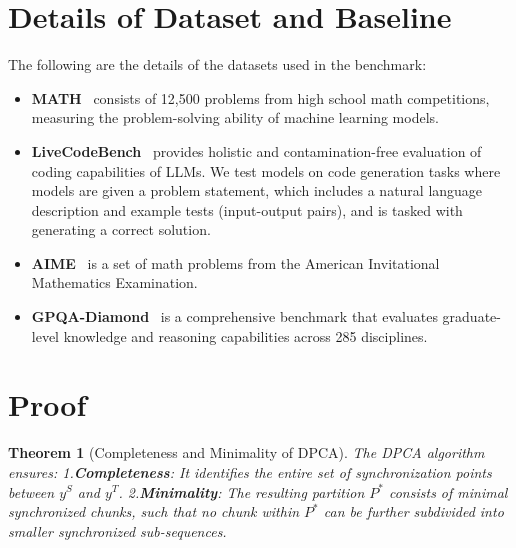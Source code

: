 \documentclass{article}
\theoremstyle{plain}
\newtheorem{theorem}{Theorem}[section]
\theoremstyle{definition}
\theoremstyle{remark}
\begin{document}
\section{Details of Dataset and Baseline}\label{app:data}
The following are the details of the datasets used in the benchmark:
\begin{itemize}
     \item \textbf{MATH}~\cite{hendrycksmath2021} consists of 12,500 problems from high school math competitions, measuring the problem-solving ability of machine learning models.
    \item \textbf{LiveCodeBench}~\cite{jain2024livecodebench} provides holistic and contamination-free evaluation of coding capabilities of LLMs. We test models on code generation tasks where models are given a problem statement, which includes a natural language description and example tests (input-output pairs), and is tasked with generating a correct solution.
    \item \textbf{AIME}~\cite{aime26} is a set of math problems from the American Invitational Mathematics Examination.
    \item \textbf{GPQA-Diamond}~\cite{rein2023gpqagraduatelevelgoogleproofqa} is a comprehensive benchmark that evaluates graduate-level knowledge and reasoning capabilities across 285 disciplines.
   
    
\end{itemize}


 
\section{Proof}\label{app:proof}

\begin{theorem}[Completeness and Minimality of DPCA]
\label{thm:minimal_partition}
The DPCA algorithm ensures: 1.\textbf{Completeness}: It identifies the entire set of synchronization points between $y^S$ and $y^T$. 2.\textbf{Minimality}: The resulting partition $P^*$ consists of minimal synchronized chunks, such that no chunk within $P^*$ can be further subdivided into smaller synchronized sub-sequences.
\end{theorem}
\end{document}
